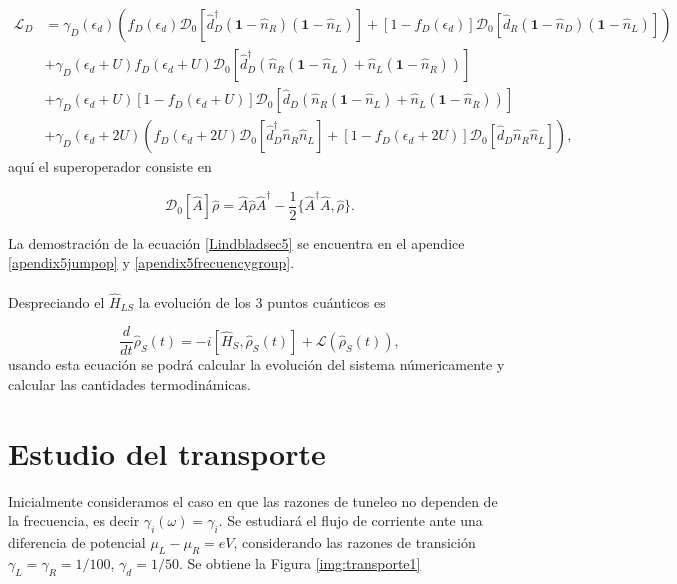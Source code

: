 \begin{align*}
    \mathcal{L}_{D} & = \gamma_{D}(\epsilon_{d})(f_{D}(\epsilon_{d})\mathcal{D}_{0}[\hat{d}^{\dagger}_{D}(\textbf{1}-\hat{n}_{R})(\textbf{1}-\hat{n}_{L}) ]  + [1-f_{D}(\epsilon_{d})]\mathcal{D}_{0}[\hat{d}_{R}(\textbf{1}-\hat{n}_{D})(\textbf{1}-\hat{n}_{L}) ]  )  \\
                    & + \gamma_{D}(\epsilon_{d}+U)f_{D}(\epsilon_{d}+U)\mathcal{D}_{0}[\hat{d}^{\dagger}_{D}(\hat{n}_{R}(\textbf{1}-\hat{n}_{L}) + \hat{n}_{L}(\textbf{1}-\hat{n}_{R})) ]  \\
                    & + \gamma_{D}(\epsilon_{d}+U)[1-f_{D}(\epsilon_{d}+U)]\mathcal{D}_{0}[\hat{d}_{D}(\hat{n}_{R}(\textbf{1}-\hat{n}_{L}) + \hat{n}_{L}(\textbf{1}-\hat{n}_{R}))]   \\
                   & + \gamma_{D}(\epsilon_{d}+2U)(f_{D}(\epsilon_{d}+2U)\mathcal{D}_{0}[\hat{d}^{\dagger}_{D}\hat{n}_{R}\hat{n}_{L} ]  + [1-f_{D}(\epsilon_{d}+2U)]\mathcal{D}_{0}[\hat{d}_{D}\hat{n}_{R}\hat{n}_{L} ]  ),   
\end{align*}
aquí el superoperador consiste en 

\begin{equation*}
    \mathcal{D}_{0}[\hat{A}]\hat{\rho} = \hat{A}\hat{\rho}\hat{A}^{\dagger}- \frac{1}{2} \{\hat{A }^{\dagger}\hat{A},\hat{\rho} \}.
\end{equation*}

La demostración de la ecuación \ref{Lindbladsec5} se encuentra en el apendice \ref{apendix5jumpop} y \ref{apendix5frecuencygroup}.\\
\\
Despreciando el $\hat{H}_{LS}$ \cite{prech2023entanglement} la evolución de los 3 puntos cuánticos es

\begin{equation*}
    \frac{d}{dt}\hat{\rho}_{S}(t) = -i[\hat{H}_{S},\hat{\rho}_{S}(t)] + \mathcal{L}(\hat{\rho}_{S}(t)),
\end{equation*}
usando esta ecuación se podrá calcular la evolución del sistema númericamente y calcular las cantidades termodinámicas.


\label{sec5:modelo}

\newpage

\section{Estudio del transporte}
Inicialmente consideramos el caso en que las razones de tuneleo no dependen de la frecuencia, es decir $\gamma_{i}(\omega) = \gamma_{i}$. Se estudiará el flujo de corriente ante una diferencia de potencial $\mu_{L}-\mu_{R} = eV$, considerando las razones de transición $\gamma_{L}=\gamma_{R}=1/100$, $\gamma_{d}=1/50$. Se obtiene la Figura \ref{img:transporte1}

